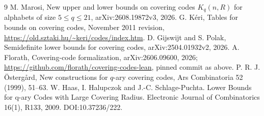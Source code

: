 \documentclass[11pt]{article}
\begin{document}
\begin{thebibliography}{9}
 M. Marosi, New upper and lower bounds on covering codes
$K_q(n,R)$ for alphabets of size $5\le q\le21$, arXiv:2608.19872v3, 2026.
 G. K\'eri, Tables for bounds on covering codes, November 2011
revision, \url{https://old.sztaki.hu/~keri/codes/index.htm}.
 D. Gijswijt and S. Polak, Semidefinite lower bounds for covering
codes, arXiv:2504.01932v2, 2026.
 A. Florath, Covering-code formalization, arXiv:2606.09600, 2026;
\url{https://github.com/florath/covering-codes-lean}, pinned commit as above.
 P. R. J. \"Osterg\aa rd, New constructions for $q$-ary
covering codes, Ars Combinatoria 52 (1999), 51--63.
 W. Haas, I. Halupczok and J.-C. Schlage-Puchta.
Lower Bounds for q-ary Codes with Large Covering Radius.
Electronic Journal of Combinatorics 16(1), R133, 2009. DOI:10.37236/222.
\end{thebibliography}
\end{document}
